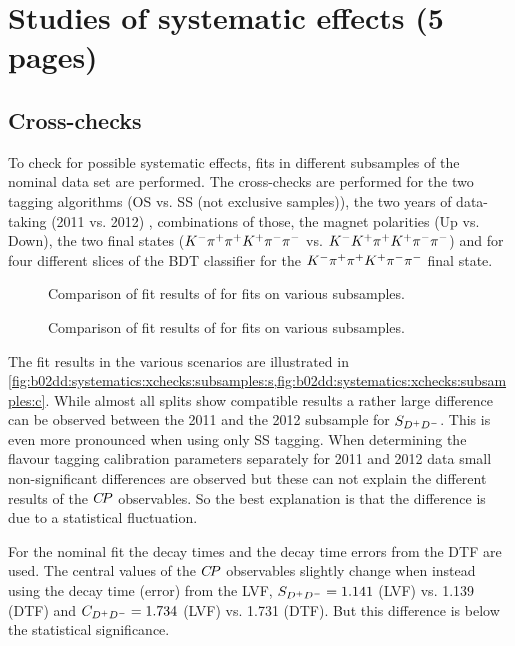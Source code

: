 
\section{Studies of systematic effects (5 pages)}
\label{sec:b02dd:systematics}

\subsection{Cross-checks}
\label{sec:systematics:xchecks}
To check for possible systematic effects, fits in different subsamples of the
nominal data set are performed. The cross-checks are performed for the two
tagging algorithms (OS vs. SS (not exclusive samples)), the two years of
data-taking (2011 vs. 2012) , combinations of those, the magnet polarities (Up
vs. Down), the two final states (${{K}^-}{{\pi}^+}{{\pi}^+}{{K}^+}{{\pi}^-}{{\pi}^-}$ vs. ${{K}^-}{{K}^+}{{\pi}^+}{{K}^+}{{\pi}^-}{{\pi}^-}$) and for four
different slices of the BDT classifier for the ${{K}^-}{{\pi}^+}{{\pi}^+}{{K}^+}{{\pi}^-}{{\pi}^-}$ final state.

\begin{figure}[thb]
\centering

\caption{
Comparison of fit results of \SDD for fits on various subsamples.}
\label{fig:b02dd:systematics:xchecks:subsamples:s}
\end{figure}
\begin{figure}[thb]
\centering

\caption{
Comparison of fit results of \CDD for fits on various subsamples.}
\label{fig:b02dd:systematics:xchecks:subsamples:c}
\end{figure}
The fit results in the various scenarios are illustrated in
\cref{fig:b02dd:systematics:xchecks:subsamples:s,fig:b02dd:systematics:xchecks:subsamples:c}.
While almost all splits show compatible results a rather large difference can
be observed between the 2011 and the 2012 subsample for $S_{{{D}^+}{{D}^-}}$. This is even
more pronounced when using only SS tagging. When determining the flavour
tagging calibration parameters separately for 2011 and 2012 data small
non-significant differences are observed but these can not explain the
different results of the ${C\!P}$ observables. So the best explanation is that
the difference is due to a statistical fluctuation.

For the nominal fit the decay times and the decay time errors from the DTF are
used. The central values of the ${C\!P}$ observables slightly change when instead
using the decay time (error) from the LVF, $S_{{{D}^+}{{D}^-}} = \num{1.141}$ (LVF) vs.
\num{1.139} (DTF) and $C_{{{D}^+}{{D}^-}} = \num{1.734}$ (LVF) vs. \num{1.731} (DTF). But
this difference is below the statistical significance.

